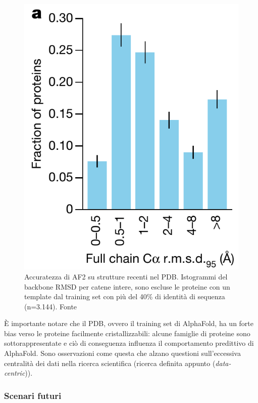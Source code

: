 \begin{figure}[!htb]
	\centering
	\includegraphics[scale=0.4]{images/af-basso.png}
	\caption{Accuratezza di AF2 su strutture recenti nel PDB. Istogrammi del backbone RMSD per catene intere, sono escluse le proteine con un template dal training set con più del 40\% di identità di sequenza (n=3.144). Fonte\cite{jumper2021highly}}
	\label{fig:af-basso}
\end{figure}

È importante notare che il PDB, ovvero il training set di AlphaFold, ha un forte bias verso le proteine facilmente cristallizzabili: alcune famiglie di proteine sono sottorappresentate e ciò di conseguenza influenza il comportamento predittivo di AlphaFold. Sono osservazioni come questa che alzano questioni sull'eccessiva centralità dei dati nella ricerca scientifica (ricerca definita appunto (\textit{data-centric})).

\subsubsection{Scenari futuri}

